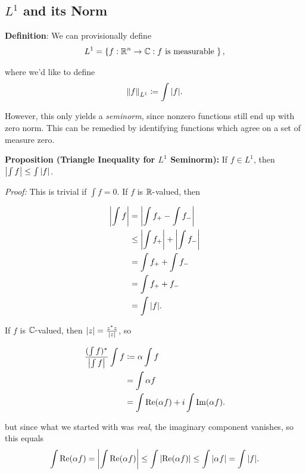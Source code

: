 \hypertarget{l1-and-its-norm}{%
\subsection{\texorpdfstring{\(L^1\) and its
Norm}{L\^{}1 and its Norm}}\label{l1-and-its-norm}}

\textbf{Definition}: We can provisionally define
\begin{align*}
L^1 = \left\{{f: {\mathbb{R}}^n \to {\mathbb{C}}: f\text{ is measurable }}\right\},
\end{align*}

where we'd like to define
\begin{align*}
{\left\lVert {f} \right\rVert}_{L^1} \coloneqq \int {\left\lvert {f} \right\rvert}
.\end{align*}

However, this only yields a \emph{seminorm}, since nonzero functions
still end up with zero norm. This can be remedied by identifying
functions which agree on a set of measure zero.

\textbf{Proposition (Triangle Inequality for \(L^1\) Seminorm):} If
\(f\in L^1\), then \({\left\lvert {\int f} \right\rvert} \leq \int {\left\lvert {f} \right\rvert}\).

\emph{Proof:} This is trivial if \(\int f = 0\). If \(f\) is
\({\mathbb{R}}{\hbox{-}}\)valued, then

\begin{align*}
{\left\lvert {\int f} \right\rvert} 
&= {\left\lvert {\int f_+ - \int f_-} \right\rvert} \\
&\leq {\left\lvert {\int f_+} \right\rvert} + {\left\lvert {\int f_-} \right\rvert} \\
&= \int f_+ + \int f_- \\
&= \int f_+ + f_- \\
&= \int {\left\lvert {f} \right\rvert}
.\end{align*}

If \(f\) is \({\mathbb{C}}{\hbox{-}}\)valued, then \({\left\lvert {z} \right\rvert} = \frac{z^* z}{{\left\lvert {z} \right\rvert}}\),
so

\begin{align*}
\frac{(\int f)^*}{{\left\lvert {\int f} \right\rvert}} \int f 
&\coloneqq \alpha \int f \\
&= \int \alpha f \\
&= \int \mathrm{Re}(\alpha f) + i\int\mathrm{Im}(\alpha f) 
.\end{align*}

but since what we started with was \emph{real}, the imaginary component
vanishes, so this equals
\begin{align*}
\int \mathrm{Re}(\alpha f) = {\left\lvert {\int \mathrm{Re}(\alpha f) } \right\rvert} \leq \int {\left\lvert {\mathrm{Re}(\alpha f) } \right\rvert} \leq \int {\left\lvert {\alpha f} \right\rvert} = \int {\left\lvert {f} \right\rvert}.
\end{align*}

